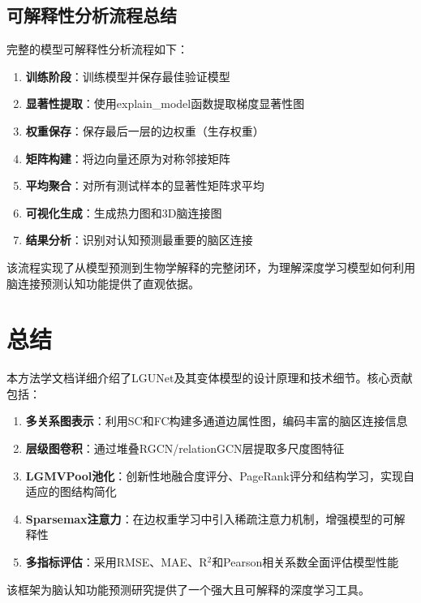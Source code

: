 \subsection{可解释性分析流程总结}

完整的模型可解释性分析流程如下：

\begin{enumerate}
    \item \textbf{训练阶段}：训练模型并保存最佳验证模型
    \item \textbf{显著性提取}：使用explain\_model函数提取梯度显著性图
    \item \textbf{权重保存}：保存最后一层的边权重（生存权重）
    \item \textbf{矩阵构建}：将边向量还原为对称邻接矩阵
    \item \textbf{平均聚合}：对所有测试样本的显著性矩阵求平均
    \item \textbf{可视化生成}：生成热力图和3D脑连接图
    \item \textbf{结果分析}：识别对认知预测最重要的脑区连接
\end{enumerate}

该流程实现了从模型预测到生物学解释的完整闭环，为理解深度学习模型如何利用脑连接预测认知功能提供了直观依据。

\newpage

\section{总结}

本方法学文档详细介绍了LGUNet及其变体模型的设计原理和技术细节。核心贡献包括：

\begin{enumerate}
    \item \textbf{多关系图表示}：利用SC和FC构建多通道边属性图，编码丰富的脑区连接信息
    \item \textbf{层级图卷积}：通过堆叠RGCN/relationGCN层提取多尺度图特征
    \item \textbf{LGMVPool池化}：创新性地融合度评分、PageRank评分和结构学习，实现自适应的图结构简化
    \item \textbf{Sparsemax注意力}：在边权重学习中引入稀疏注意力机制，增强模型的可解释性
    \item \textbf{多指标评估}：采用RMSE、MAE、R$^2$和Pearson相关系数全面评估模型性能
\end{enumerate}

该框架为脑认知功能预测研究提供了一个强大且可解释的深度学习工具。

\newpage

